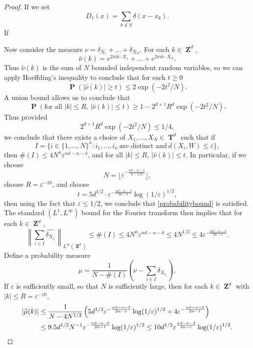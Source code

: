 \documentclass[12pt,reqno]{article}
\numberwithin{equation}{section}
\DeclareMathOperator{\ZZ}{\mathbf{Z}}
\DeclareMathOperator{\TT}{\mathbf{T}}
\DeclareMathOperator{\PP}{\mathbf{P}}
\begin{document}
\begin{proof}
    If we set
    \[ D_1(x) = \sum_{k \not \in S} \delta(x - x_k). \]
    If


    Now consider the measure $\nu = \delta_{X_1} + \dots + \delta_{X_N}$. For each $k \in \ZZ^d$,
    \[ \widehat{\nu}(k) = e^{2 \pi i k \cdot X_1} + \dots + e^{2 \pi i k \cdot X_N}. \] 
    Thus $\widehat{\nu}(k)$ is the sum of $N$ bounded independent random variables, so we can apply Hoeffding's inequality to conclude that for each $t \geq 0$
    \[ \PP(|\widehat{\nu}(k)| \geq t) \leq 2 \exp ( - 2 t^2 / N). \]
    A union bound allows us to conclude that
    \[ \PP \left( \text{for all $|k| \leq R$, $|\widehat{\nu}(k)| \leq t$} \right) \geq 1 - 2^{d+1} R^d \exp ( - 2 t^2 / N). \]
    Thus provided
    \begin{equation} \label{probabilitybound}
        2^{d+1} R^d \exp(-2t^2/N) \leq 1/4,
    \end{equation}
    we conclude that there exists a choice of $X_1, \dots, X_N \in \TT^d$ such that if
    \[ I = \{ i \in \{ 1, \dots, N \}^n : i_1, \dots, i_n\ \text{are distinct and}\ d(X_i,W) \leq \varepsilon \}, \]
    then $\#(I) \leq 4 N^n \varepsilon^{nd - \alpha - \delta}$, and for all $|k| \leq R$, $|\widehat{\nu}(k)| \leq t$. In particular, if we choose
    \[ N = \lfloor \varepsilon^{-\frac{nd - \alpha - \delta}{n - 1/2}} \rfloor, \]
    choose $R = \varepsilon^{-10}$, and choose
    \[ t = 5d^{1/2} \cdot \varepsilon^{- \frac{nd - \alpha - \delta}{2n - 1}} \log(1/\varepsilon)^{1/2}, \]
    then using the fact that $\varepsilon \leq 1/2$, we conclude that \eqref{probabilitybound} is satisfied. The standard $(L^1,L^\infty)$ bound for the Fourier transform then implies that for each $k \in \ZZ^d$,
    \[ \left\| \sum_{i \in I} \widehat{\delta_{X_{i_1}}} \right\|_{L^\infty(\ZZ^d)} \leq \#(I) \leq 4 N^n \varepsilon^{nd - \alpha - \delta} \leq 4 N^{1/2} \leq 4 \varepsilon^{- \frac{nd - \alpha - \delta}{2n - 1}}. \]
    Define a probability measure
    \[ \mu = \frac{1}{N - \#(I)} \left( \nu - \sum_{i \in I} \delta_{X_{i_1}} \right), \]
    If $\varepsilon$ is sufficiently small, so that $N$ is sufficiently large, then for each $k \in \ZZ^d$ with $|k| \leq R = \varepsilon^{-10}$,
    \begin{align*}
        |\widehat{\mu}(k)| &\leq \frac{1}{N - 4N^{1/2}} \left( 5d^{1/2} \varepsilon^{- \frac{nd - \alpha - \delta}{2n - 1}} \log(1/\varepsilon)^{1/2} +  4 \varepsilon^{- \frac{nd - \alpha - \delta}{2n - 1}} \right)\\
        &\leq 9.5 d^{1/2} N^{-1} \varepsilon^{- \frac{nd - \alpha - \delta}{2n - 1}} \log(1/\varepsilon)^{1/2} \leq 10 d^{1/2} \varepsilon^{\frac{nd - \alpha - \delta}{2n - 1}} \log(1/\varepsilon)^{1/2}. \qedhere
    \end{align*}
\end{proof}
\end{document}
